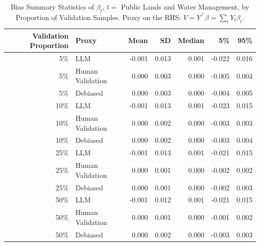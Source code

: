 \begin{table}

\caption{Bias Summary Statistics of $\beta_{t}$, $t=$ Public Lands and Water Management, by Proportion of Validation Samples.
      Proxy on the RHS: $V = Y^\top \beta = \sum_{t} Y_t \beta_t$.}
\centering
\begin{tabular}[t]{rlrrrrr}
\toprule
Validation Proportion & Proxy & Mean & SD & Median & 5\% & 95\%\\
\midrule
5\% & LLM & -0.001 & 0.013 & 0.001 & -0.022 & 0.016\\
5\% & Human Validation & 0.000 & 0.003 & 0.000 & -0.005 & 0.004\\
5\% & Debiased & 0.000 & 0.003 & 0.000 & -0.004 & 0.005\\
10\% & LLM & -0.001 & 0.013 & 0.001 & -0.023 & 0.015\\
10\% & Human Validation & 0.000 & 0.002 & 0.000 & -0.003 & 0.003\\
10\% & Debiased & 0.000 & 0.002 & 0.000 & -0.003 & 0.004\\
25\% & LLM & -0.001 & 0.013 & 0.001 & -0.021 & 0.015\\
25\% & Human Validation & 0.000 & 0.001 & 0.000 & -0.002 & 0.002\\
25\% & Debiased & 0.000 & 0.001 & 0.000 & -0.002 & 0.003\\
50\% & LLM & -0.001 & 0.012 & 0.001 & -0.021 & 0.015\\
50\% & Human Validation & 0.000 & 0.001 & 0.000 & -0.001 & 0.002\\
50\% & Debiased & 0.000 & 0.002 & 0.000 & -0.003 & 0.003\\
\bottomrule
\end{tabular}
\end{table}
